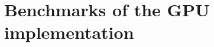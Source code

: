 \documentclass[draft]{agujournal2019}
\begin{document}
%
%

%
%



%
%

\FloatBarrier

\appendix

\section{Benchmarks of the GPU implementation}
\end{document}
